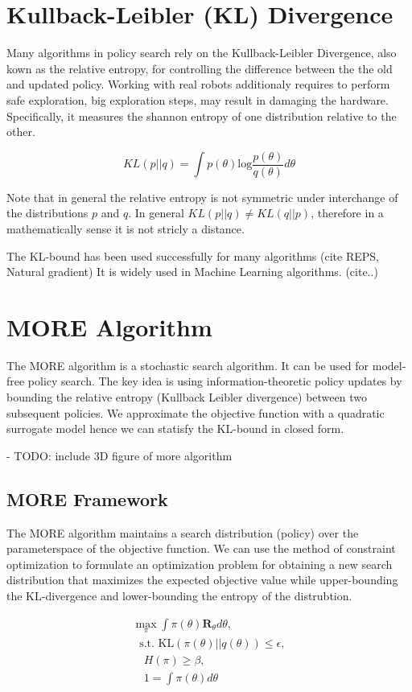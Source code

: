 \section{Kullback-Leibler (KL) Divergence}
Many algorithms in policy search rely on the Kullback-Leibler Divergence, also
kown as the relative entropy, for controlling
the difference between the the old and updated policy.
Working with real robots additionaly requires to perform safe exploration, big
exploration steps, may result in damaging the hardware.
Specifically, it measures the shannon entropy of one distribution relative to the
other.

$$ KL(p || q) = \int p(\theta) \text{log} \frac{p(\theta)}{q(\theta)} d \theta $$

Note that in general the relative entropy is not symmetric under interchange of the
distributions $p$ and $q$. In general $KL(p || q) \neq KL(q || p) $, therefore
in a mathematically sense it is not stricly a distance.

The KL-bound has been used successfully for many algorithms (cite REPS, Natural gradient)
It is widely used in Machine Learning algorithms. (cite..)

\section{MORE Algorithm}
The MORE algorithm is a stochastic search algorithm. It can be used for
model-free policy search. The key idea is using information-theoretic policy updates
by bounding the relative entropy (Kullback Leibler divergence) between two subsequent
policies. We approximate the objective function with a quadratic surrogate model hence
we can statisfy the KL-bound in closed form.


- TODO: include 3D figure of more algorithm

\subsection{MORE Framework}
The MORE algorithm maintains a search distribution (policy) over the parameterspace
of the objective function. We can use the method of constraint optimization
to formulate an optimization problem for obtaining a new search distribution that
maximizes the expected objective value while upper-bounding the KL-divergence and
lower-bounding the entropy of the distrubtion.

\begin{align}
 \max_{\pi} \int \pi(\theta) \mathbf{R}_{\theta} d\theta, \\
\; \text{ s.t. KL}(\pi(\theta)||q(\theta)) \leq \epsilon, \\
\quad H(\pi) \geq \beta, \\
\quad 1 = \int \pi(\theta) d\theta
\end{align}


